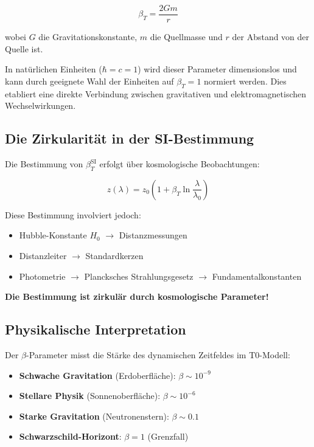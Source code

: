 \begin{equation}
	\beta_T = \frac{2Gm}{r}
	\label{eq:beta_definition}
\end{equation}

wobei $G$ die Gravitationskonstante, $m$ die Quellmasse und $r$ der Abstand von der Quelle ist.

In natürlichen Einheiten ($\hbar = c = 1$) wird dieser Parameter dimensionslos und kann durch geeignete Wahl der Einheiten auf $\beta_T = 1$ normiert werden. Dies etabliert eine direkte Verbindung zwischen gravitativen und elektromagnetischen Wechselwirkungen.

\subsection{Die Zirkularität in der SI-Bestimmung}
\label{subsec:beta_circularity}

Die Bestimmung von $\beta_T^{\text{SI}}$ erfolgt über kosmologische Beobachtungen:

\begin{equation}
	z(\lambda) = z_0\left(1 + \beta_T \ln\frac{\lambda}{\lambda_0}\right)
\end{equation}

Diese Bestimmung involviert jedoch:
\begin{itemize}
	\item Hubble-Konstante $H_0$ $\rightarrow$ Distanzmessungen
	\item Distanzleiter $\rightarrow$ Standardkerzen
	\item Photometrie $\rightarrow$ Plancksches Strahlungsgesetz $\rightarrow$ Fundamentalkonstanten
\end{itemize}

\textbf{Die Bestimmung ist zirkulär durch kosmologische Parameter!}

\subsection{Physikalische Interpretation}
\label{subsec:beta_physical}

Der $\beta$-Parameter misst die Stärke des dynamischen Zeitfeldes im T0-Modell:

\begin{itemize}
	\item \textbf{Schwache Gravitation} (Erdoberfläche): $\beta \sim 10^{-9}$
	\item \textbf{Stellare Physik} (Sonnenoberfläche): $\beta \sim 10^{-6}$
	\item \textbf{Starke Gravitation} (Neutronenstern): $\beta \sim 0.1$
	\item \textbf{Schwarzschild-Horizont}: $\beta = 1$ (Grenzfall)
\end{itemize}

